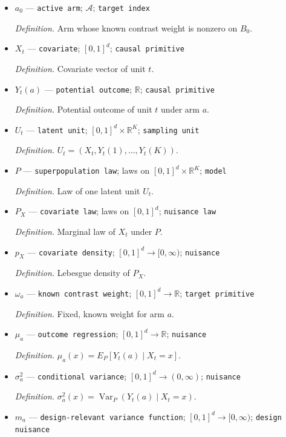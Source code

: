 \documentclass{article}
\begin{document}
\begin{itemize}
  \item \(a_0\) --- \texttt{active arm}; \(\mathcal A\); \texttt{target index}
  \par\smallskip\noindent\emph{Definition.} Arm whose known contrast weight is nonzero on \(B_0\).
  \item \(X_t\) --- \texttt{covariate}; \([0,1]^d\); \texttt{causal primitive}
  \par\smallskip\noindent\emph{Definition.} Covariate vector of unit \(t\).
  \item \(Y_t(a)\) --- \texttt{potential outcome}; \(\mathbb R\); \texttt{causal primitive}
  \par\smallskip\noindent\emph{Definition.} Potential outcome of unit \(t\) under arm \(a\).
  \item \(U_t\) --- \texttt{latent unit}; \([0,1]^d\times\mathbb R^K\); \texttt{sampling unit}
  \par\smallskip\noindent\emph{Definition.} \(U_t=(X_t,Y_t(1),\ldots,Y_t(K))\).
  \item \(P\) --- \texttt{superpopulation law}; laws on \([0,1]^d\times\mathbb R^K\); \texttt{model}
  \par\smallskip\noindent\emph{Definition.} Law of one latent unit \(U_t\).
  \item \(P_X\) --- \texttt{covariate law}; laws on \([0,1]^d\); \texttt{nuisance law}
  \par\smallskip\noindent\emph{Definition.} Marginal law of \(X_t\) under \(P\).
  \item \(p_X\) --- \texttt{covariate density}; \([0,1]^d\to[0,\infty)\); \texttt{nuisance}
  \par\smallskip\noindent\emph{Definition.} Lebesgue density of \(P_X\).
  \item \(\omega_a\) --- \texttt{known contrast weight}; \([0,1]^d\to\mathbb R\); \texttt{target primitive}
  \par\smallskip\noindent\emph{Definition.} Fixed, known weight for arm \(a\).
  \item \(\mu_a\) --- \texttt{outcome regression}; \([0,1]^d\to\mathbb R\); \texttt{nuisance}
  \par\smallskip\noindent\emph{Definition.} \(\mu_a(x)=E_P[Y_t(a)\mid X_t=x]\).
  \item \(\sigma_a^2\) --- \texttt{conditional variance}; \([0,1]^d\to(0,\infty)\); \texttt{nuisance}
  \par\smallskip\noindent\emph{Definition.} \(\sigma_a^2(x)=\operatorname{Var}_P(Y_t(a)\mid X_t=x)\).
  \item \(m_a\) --- \texttt{design-\allowbreak{}relevant variance function}; \([0,1]^d\to[0,\infty)\); \texttt{design nuisance}

\end{itemize}
\end{document}
